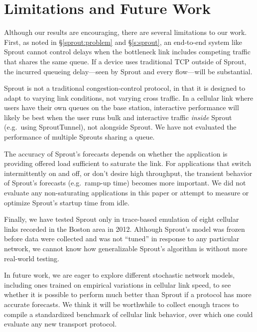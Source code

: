 \section{Limitations and Future Work}

Although our results are encouraging, there are several limitations to
our work. First, as noted in \S\ref{sprout:problem} and \S\ref{s:sprout},
an end-to-end system like Sprout cannot control delays when the
bottleneck link includes competing traffic that shares the same
queue. If a device uses traditional TCP outside of Sprout, the
incurred queueing delay---seen by Sprout and every flow---will be
substantial.

Sprout is not a traditional congestion-control protocol, in that it is
designed to adapt to varying link conditions, not varying cross
traffic. In a cellular link where users have their own queues on the
base station, interactive performance will likely be best when the
user runs bulk and interactive traffic \emph{inside} Sprout
(e.g.~using SproutTunnel), not alongside Sprout. We have not evaluated
the performance of multiple Sprouts sharing a queue.

The accuracy of Sprout's forecasts depends on whether the application
is providing offered load sufficient to saturate the link. For
applications that switch intermittently on and off, or don't desire
high throughput, the transient behavior of Sprout's forecasts
(e.g.~ramp-up time) becomes more important. We did not evaluate any
non-saturating applications in this paper or attempt to measure or optimize
Sprout's startup time from idle.

Finally, we have tested Sprout only in trace-based emulation of eight
cellular links recorded in the Boston area in 2012. Although Sprout's
model was frozen before data were collected and was not ``tuned'' in
response to any particular network, we cannot know how generalizable
Sprout's algorithm is without more real-world testing.

In future work, we are eager to explore different stochastic network
models, including ones trained on empirical variations in cellular
link speed, to see whether it is possible to perform much better than
Sprout if a protocol has more accurate forecasts. We think it will be
worthwhile to collect enough traces to compile a standardized
benchmark of cellular link behavior, over which one could evaluate any
new transport protocol.
